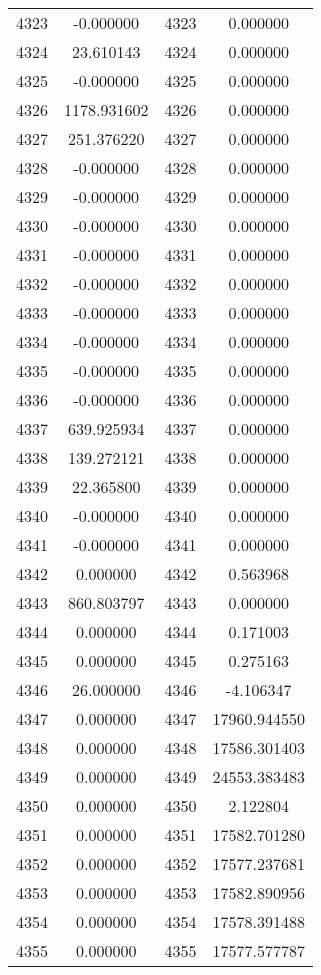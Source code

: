 \documentclass[12pt]{article}
\begin{document}
\begin{longtable}{@{}cccc@{}}
4323 & -0.000000 & 4323 & 0.000000 \\
4324 & 23.610143 & 4324 & 0.000000 \\
4325 & -0.000000 & 4325 & 0.000000 \\
4326 & 1178.931602 & 4326 & 0.000000 \\
4327 & 251.376220 & 4327 & 0.000000 \\
4328 & -0.000000 & 4328 & 0.000000 \\
4329 & -0.000000 & 4329 & 0.000000 \\
4330 & -0.000000 & 4330 & 0.000000 \\
4331 & -0.000000 & 4331 & 0.000000 \\
4332 & -0.000000 & 4332 & 0.000000 \\
4333 & -0.000000 & 4333 & 0.000000 \\
4334 & -0.000000 & 4334 & 0.000000 \\
4335 & -0.000000 & 4335 & 0.000000 \\
4336 & -0.000000 & 4336 & 0.000000 \\
4337 & 639.925934 & 4337 & 0.000000 \\
4338 & 139.272121 & 4338 & 0.000000 \\
4339 & 22.365800 & 4339 & 0.000000 \\
4340 & -0.000000 & 4340 & 0.000000 \\
4341 & -0.000000 & 4341 & 0.000000 \\
4342 & 0.000000 & 4342 & 0.563968 \\
4343 & 860.803797 & 4343 & 0.000000 \\
4344 & 0.000000 & 4344 & 0.171003 \\
4345 & 0.000000 & 4345 & 0.275163 \\
4346 & 26.000000 & 4346 & -4.106347 \\
4347 & 0.000000 & 4347 & 17960.944550 \\
4348 & 0.000000 & 4348 & 17586.301403 \\
4349 & 0.000000 & 4349 & 24553.383483 \\
4350 & 0.000000 & 4350 & 2.122804 \\
4351 & 0.000000 & 4351 & 17582.701280 \\
4352 & 0.000000 & 4352 & 17577.237681 \\
4353 & 0.000000 & 4353 & 17582.890956 \\
4354 & 0.000000 & 4354 & 17578.391488 \\
4355 & 0.000000 & 4355 & 17577.577787 \\

\end{longtable}
\end{document}
